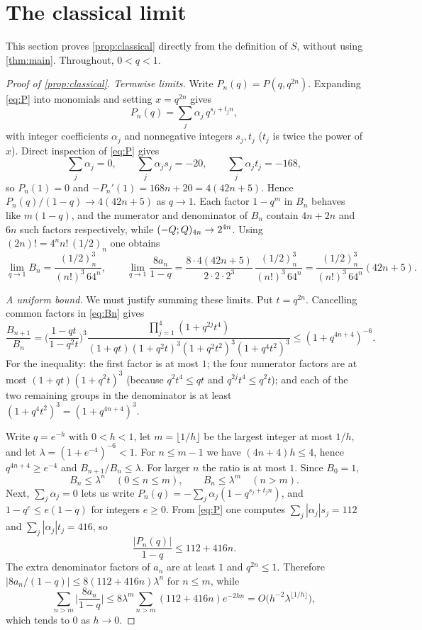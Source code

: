 \section{The classical limit}\label{sec:classical}

This section proves \cref{prop:classical} directly from the definition of
$S$, without using \cref{thm:main}. Throughout, $0<q<1$.

\begin{proof}[Proof of \cref{prop:classical}]
\emph{Termwise limits.} Write $P_n(q)=P(q,q^{2n})$. Expanding \eqref{eq:P} into
monomials and setting $x=q^{2n}$ gives
\begin{equation}\label{eq:Pn}
P_n(q)=\sum_j\alpha_j\,q^{s_j+t_jn},
\end{equation}
with integer coefficients $\alpha_j$ and nonnegative integers $s_j,t_j$ ($t_j$
is twice the power of $x$). Direct inspection of \eqref{eq:P} gives
\[
\sum_j\alpha_j=0,\qquad \sum_j\alpha_js_j=-20,\qquad\sum_j\alpha_jt_j=-168,
\]
so $P_n(1)=0$ and $-P_n'(1)=168n+20=4(42n+5)$. Hence
$P_n(q)/(1-q)\to4(42n+5)$ as $q\to1$. Each factor $1-q^m$ in $B_n$ behaves like
$m(1-q)$, and the numerator and denominator of $B_n$ contain $4n+2n$ and $6n$
such factors respectively, while $(-Q;Q)_{4n}\to2^{4n}$. Using
$(2n)!=4^nn!\,(1/2)_n$ one obtains
\[
\lim_{q\to1}B_n=\frac{(1/2)_n^3}{(n!)^3\,64^n},\qquad
\lim_{q\to1}\frac{8a_n}{1-q}=\frac{8\cdot4(42n+5)}{2\cdot2\cdot2^3}\,
\frac{(1/2)_n^3}{(n!)^3\,64^n}=\frac{(1/2)_n^3}{(n!)^3\,64^n}(42n+5).
\]

\emph{A uniform bound.} We must justify summing these limits. Put
$t=q^{2n}$. Cancelling common factors in \eqref{eq:Bn} gives
\[
\frac{B_{n+1}}{B_n}=\Big(\frac{1-qt}{1-q^2t}\Big)^3
\frac{\prod_{j=1}^4(1+q^{2j}t^4)}{(1+qt)(1+q^2t)^3(1+q^2t^2)^3(1+q^4t^2)^3}
\le(1+q^{4n+4})^{-6}.
\]
For the inequality: the first factor is at most $1$; the four numerator
factors are at most $(1+qt)(1+q^2t)^3$ (because $q^2t^4\le qt$ and
$q^{2j}t^4\le q^2t$); and each of the two remaining groups in the denominator
is at least $(1+q^4t^2)^3=(1+q^{4n+4})^3$.

Write $q=e^{-h}$ with $0<h<1$, let $m=\lfloor1/h\rfloor$ be the largest
integer at most $1/h$, and let $\lambda=(1+e^{-4})^{-6}<1$. For $n\le m-1$ we
have $(4n+4)h\le4$, hence $q^{4n+4}\ge e^{-4}$ and $B_{n+1}/B_n\le\lambda$.
For larger $n$ the ratio is at most $1$. Since $B_0=1$,
\[
B_n\le\lambda^n\quad(0\le n\le m),\qquad B_n\le\lambda^m\quad(n>m).
\]
Next, $\sum_j\alpha_j=0$ lets us write $P_n(q)=-\sum_j\alpha_j(1-q^{s_j+t_jn})$,
and $1-q^e\le e(1-q)$ for integers $e\ge0$. From \eqref{eq:P} one computes
$\sum_j|\alpha_j|s_j=112$ and $\sum_j|\alpha_j|t_j=416$, so
\[
\frac{|P_n(q)|}{1-q}\le112+416n .
\]
The extra denominator factors of $a_n$ are at least $1$ and $q^{2n}\le1$.
Therefore $|8a_n/(1-q)|\le8(112+416n)\lambda^n$ for $n\le m$, while
\[
\sum_{n>m}\Big|\frac{8a_n}{1-q}\Big|\le8\lambda^m\sum_{n>m}(112+416n)e^{-2hn}
=O\big(h^{-2}\lambda^{\lfloor1/h\rfloor}\big),
\]
which tends to $0$ as $h\to0$.


\end{proof}

